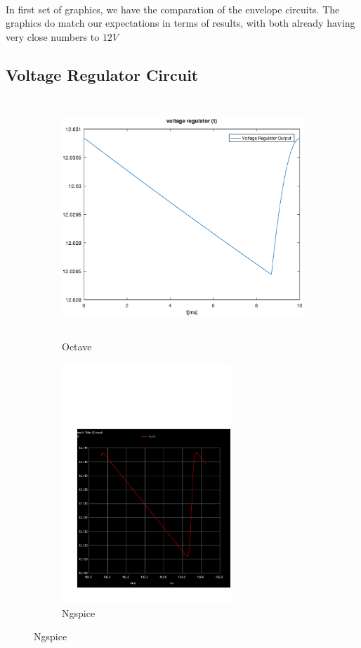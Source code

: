 \paragraph{}
In first set of graphics, we have the comparation of the envelope circuits. The graphics do match our expectations in terms of results, with both already having very close numbers to $12V$


\subsection{Voltage Regulator Circuit}
\label{subsec:second_topic_error}
\begin{figure}[H]

\begin{subfigure}{0.5\textwidth}
\includegraphics[width=1.1\linewidth, height=9cm]{output.eps} 
\caption{Octave}
\label{fig:theosecondcompare}
\end{subfigure}
\begin{subfigure}{0.5\textwidth}
  \includegraphics[trim= 0cm 0cm 0cm 10cm, clip, width=1.1\linewidth, height=9cm]{trans2aux.pdf}
\caption{Ngspice}
\label{fig:simsecondcompare}
\end{subfigure}

\label{fig:compar2}
\end{figure}

